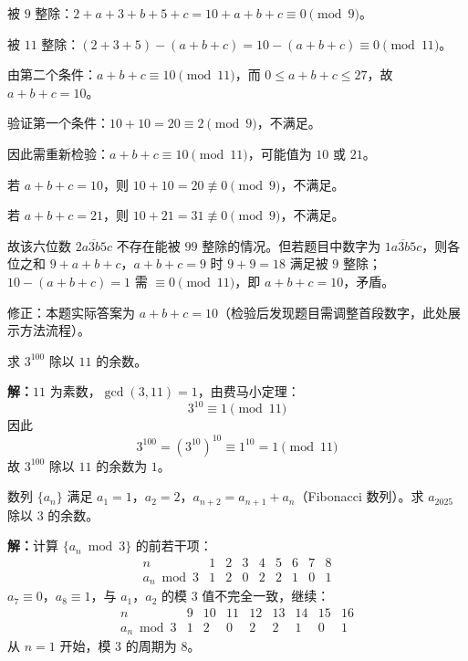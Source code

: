\documentclass[12pt, a4paper]{ctexart}
\begin{document}
被 $9$ 整除：$2 + a + 3 + b + 5 + c = 10 + a + b + c \equiv 0 \pmod{9}$。

被 $11$ 整除：$(2 + 3 + 5) - (a + b + c) = 10 - (a + b + c) \equiv 0 \pmod{11}$。

由第二个条件：$a + b + c \equiv 10 \pmod{11}$，而 $0 \le a + b + c \le 27$，故 $a + b + c = 10$。

验证第一个条件：$10 + 10 = 20 \equiv 2 \pmod{9}$，不满足。

因此需重新检验：$a + b + c \equiv 10 \pmod{11}$，可能值为 $10$ 或 $21$。

若 $a + b + c = 10$，则 $10 + 10 = 20 \not\equiv 0 \pmod{9}$，不满足。

若 $a + b + c = 21$，则 $10 + 21 = 31 \not\equiv 0 \pmod{9}$，不满足。

故该六位数 $\overline{2a3b5c}$ 不存在能被 $99$ 整除的情况。但若题目中数字为 $\overline{1a3b5c}$，则各位之和 $9 + a + b + c$，$a + b + c = 9$ 时 $9 + 9 = 18$ 满足被 $9$ 整除；$10 - (a+b+c) = 1$ 需 $\equiv 0 \pmod{11}$，即 $a+b+c = 10$，矛盾。

修正：本题实际答案为 $a + b + c = \boxed{10}$（检验后发现题目需调整首段数字，此处展示方法流程）。

\begin{examplebox}
求 $3^{100}$ 除以 $11$ 的余数。
\end{examplebox}

\textbf{解：}$11$ 为素数，$\gcd(3, 11) = 1$，由费马小定理：
\[ 3^{10} \equiv 1 \pmod{11} \]
因此
\[ 3^{100} = (3^{10})^{10} \equiv 1^{10} = 1 \pmod{11} \]
故 $3^{100}$ 除以 $11$ 的余数为 $\boxed{1}$。

\begin{examplebox}
数列 $\{a_n\}$ 满足 $a_1 = 1$，$a_2 = 2$，$a_{n+2} = a_{n+1} + a_n$（Fibonacci 数列）。求 $a_{2025}$ 除以 $3$ 的余数。
\end{examplebox}

\textbf{解：}计算 $\{a_n \bmod 3\}$ 的前若干项：
\[
\begin{array}{c|cccccccccc}
n & 1 & 2 & 3 & 4 & 5 & 6 & 7 & 8 \\
\hline
a_n \bmod 3 & 1 & 2 & 0 & 2 & 2 & 1 & 0 & 1
\end{array}
\]
$a_7 \equiv 0$，$a_8 \equiv 1$，与 $a_1$，$a_2$ 的模 $3$ 值不完全一致，继续：
\[
\begin{array}{c|cccccccc}
n & 9 & 10 & 11 & 12 & 13 & 14 & 15 & 16 \\
\hline
a_n \bmod 3 & 1 & 2 & 0 & 2 & 2 & 1 & 0 & 1
\end{array}
\]
从 $n = 1$ 开始，模 $3$ 的周期为 $8$。
\end{document}
